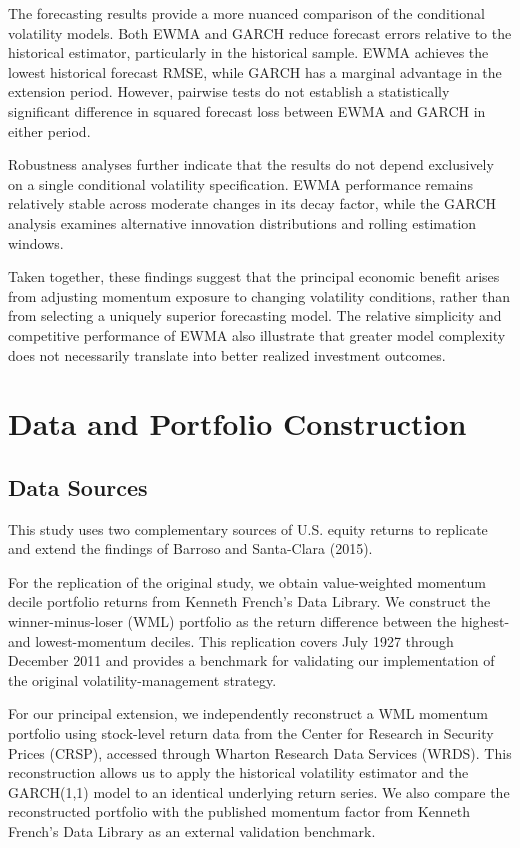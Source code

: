 \documentclass[11pt]{article}
\begin{document}
The forecasting results provide a more
nuanced comparison of the conditional
volatility models. Both EWMA and GARCH
reduce forecast errors relative to the
historical estimator, particularly in
the historical sample. EWMA achieves
the lowest historical forecast RMSE,
while GARCH has a marginal advantage
in the extension period. However,
pairwise tests do not establish a
statistically significant difference
in squared forecast loss between
EWMA and GARCH in either period.

Robustness analyses further indicate
that the results do not depend
exclusively on a single conditional
volatility specification. EWMA
performance remains relatively stable
across moderate changes in its decay
factor, while the GARCH analysis
examines alternative innovation
distributions and rolling estimation
windows.

Taken together, these findings
suggest that the principal economic
benefit arises from adjusting
momentum exposure to changing
volatility conditions, rather than
from selecting a uniquely superior
forecasting model. The relative
simplicity and competitive performance
of EWMA also illustrate that greater
model complexity does not necessarily
translate into better realized
investment outcomes.




\section{Data and Portfolio Construction}
\label{sec:data}

\subsection{Data Sources}

This study uses two complementary sources of U.S. equity
returns to replicate and extend the findings of Barroso
and Santa-Clara (2015).

For the replication of the original study, we obtain
value-weighted momentum decile portfolio returns from
Kenneth French's Data Library. We construct the
winner-minus-loser (WML) portfolio as the return
difference between the highest- and lowest-momentum
deciles. This replication covers July 1927 through
December 2011 and provides a benchmark for validating
our implementation of the original volatility-management
strategy.

For our principal extension, we independently reconstruct
a WML momentum portfolio using stock-level return data
from the Center for Research in Security Prices (CRSP),
accessed through Wharton Research Data Services (WRDS).
This reconstruction allows us to apply the historical
volatility estimator and the GARCH(1,1) model to an
identical underlying return series. We also compare the
reconstructed portfolio with the published momentum
factor from Kenneth French's Data Library as an external
validation benchmark.
\end{document}
